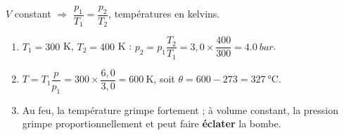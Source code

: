 \documentclass[11pt,a4paper]{article}
\begin{document}
\begin{corrige}
$V$ constant $\Rightarrow$ $\dfrac{p_1}{T_1}=\dfrac{p_2}{T_2}$, températures en kelvins.
\begin{enumerate}[label=\alph*)]
  \item $T_1=300$ K, $T_2=400$ K : $p_2=p_1\dfrac{T_2}{T_1}=3{,}0\times\dfrac{400}{300}=\qty{4.0}{bar}$.
  \item $T=T_1\dfrac{p}{p_1}=300\times\dfrac{6{,}0}{3{,}0}=\qty{600}{\kelvin}$, soit
        $\theta=600-273=\qty{327}{\degreeCelsius}$.
  \item Au feu, la température grimpe fortement ; à volume constant, la pression grimpe proportionnellement
        et peut faire \textbf{éclater} la bombe.
\end{enumerate}
\end{corrige}
\end{document}
